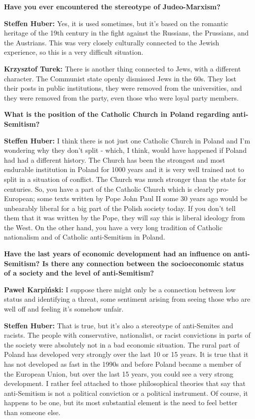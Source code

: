 \sloppy
\textbf{Have you ever encountered the stereotype of Judeo-Marxism?} 

\textbf{Steffen Huber:} Yes, it is used sometimes, but it's based on the romantic heritage of the 19th century in the fight against the Russians, the Prussians, and the Austrians. This was very closely culturally connected to the Jewish experience, so this is a very difficult situation.\par
\textbf{Krzysztof Turek:} There is another thing connected to Jews, with a different character. The Communist state openly dismissed Jews in the 60s. They lost their posts in public institutions, they were removed from the universities, and they were removed from the party, even those who were loyal party members. 

\textbf{What is the position of the Catholic Church in Poland regarding anti-Semitism?} 

\textbf{Steffen Huber:} I think there is not just one Catholic Church in Poland and I'm wondering why they don't split - which, I think, would have happened if Poland had had a different history. The Church has been the strongest and most endurable institution in Poland for 1000 years and it is very well trained not to split in a situation of conflict. The Church was much stronger than the state for centuries. So, you have a part of the Catholic Church which is clearly pro-European; some texts written by Pope John Paul II some 30 years ago would be unbearably liberal for a big part of the Polish society today. If you don't tell them that it was written by the Pope, they will say this is liberal ideology from the West. On the other hand, you have a very long tradition of Catholic nationalism and of Catholic anti-Semitism in Poland. 

\textbf{Have the last years of economic development had an influence on anti-Semitism? Is there any connection between the socioeconomic status of a society and the level of anti-Semitism?} 

\textbf{Paweł Karpiński:} I suppose there might only be a connection between low status and identifying a threat, some sentiment arising from seeing those who are well off and feeling it's somehow unfair. \par  
\textbf{Steffen Huber:} That is true, but it's also a stereotype of anti-Semites and racists. The people with conservative, nationalist, or racist convictions in parts of the society were absolutely not in a bad economic situation. The rural part of Poland has developed very strongly over the last 10 or 15 years. It is true that it has not developed as fast in the 1990s and before Poland became a member of the European Union, but over the last 15 years, you could see a very strong development. I rather feel attached to those philosophical theories that say that anti-Semitism is not a political conviction or a political instrument. Of course, it happens to be one, but its most substantial element is the need to feel better than someone else.\\ 

